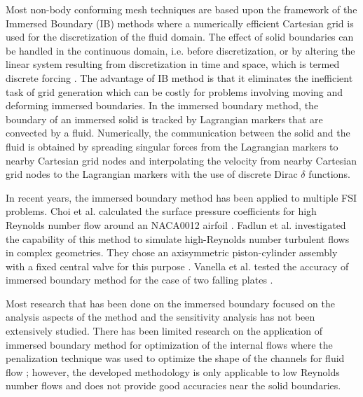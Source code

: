 \documentclass[12pt]{aiaa-pretty}
\begin{document}
Most non-body conforming mesh techniques are based upon the framework of the Immersed Boundary (IB) methods where a numerically efficient Cartesian grid is used for the discretization of the fluid domain. The effect of solid boundaries can be handled in the continuous domain, i.e. before discretization, or by altering the linear system resulting from discretization in time and space, which is termed discrete forcing \cite{mittal2005immersed}. The advantage of IB method is that it eliminates the inefficient task of grid generation which can be costly for problems involving moving and deforming immersed boundaries. In the immersed boundary method, the boundary of an immersed solid is tracked by Lagrangian markers that are convected by a fluid. Numerically, the communication between the solid and the fluid is obtained by spreading singular forces from the Lagrangian markers to nearby Cartesian grid nodes and interpolating the velocity from nearby Cartesian grid nodes to the Lagrangian markers with the use of discrete Dirac $\delta$ functions.

In recent years, the immersed boundary method has been applied to multiple FSI problems. Choi et al. calculated the surface pressure coefficients for high Reynolds number flow around an NACA0012 airfoil \cite{choi2007immersed}. Fadlun et al. investigated the capability of this method to simulate high-Reynolds number turbulent flows in complex geometries. They chose an axisymmetric piston-cylinder assembly with a fixed central valve for this purpose \cite{fadlun2000combined}. Vanella et al. tested the accuracy of immersed boundary method for the case of two falling plates \cite{vanella2010direct}. 

Most research that has been done on the immersed boundary focused on the analysis aspects of the method and the sensitivity analysis has not been extensively studied. There has been limited research on the application of immersed boundary method for optimization of the internal flows where the penalization technique was used to optimize the shape of the channels for fluid flow \cite{challis2009level, kreissl2012levelset}; however, the developed methodology is only applicable to low Reynolds number flows and does not provide good accuracies near the solid boundaries.
\end{document}
